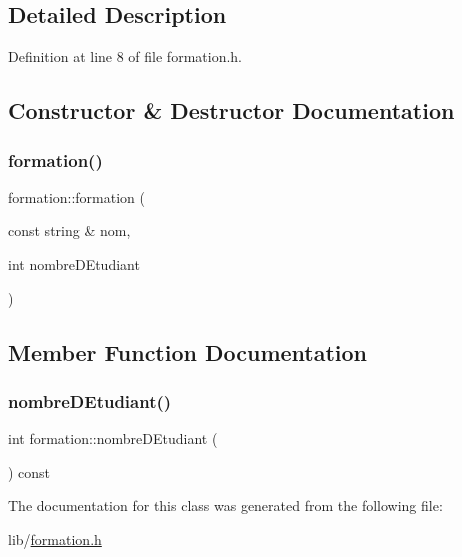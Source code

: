 \subsection{Detailed Description}


Definition at line 8 of file formation.\+h.



\subsection{Constructor \& Destructor Documentation}
\hypertarget{classformation_af34ced9e0539ebc32d9f87a79e3b383a}{}\label{classformation_af34ced9e0539ebc32d9f87a79e3b383a} 
\subsubsection{\texorpdfstring{formation()}{formation()}}
{\footnotesize\ttfamily formation\+::formation (\begin{DoxyParamCaption}\item[{const string \&}]{nom,  }\item[{int}]{nombre\+D\+Etudiant }\end{DoxyParamCaption})}



\subsection{Member Function Documentation}
\hypertarget{classformation_ad2cf7556c2c72212e1305a287ce25580}{}\label{classformation_ad2cf7556c2c72212e1305a287ce25580} 
\subsubsection{\texorpdfstring{nombre\+D\+Etudiant()}{nombreDEtudiant()}}
{\footnotesize\ttfamily int formation\+::nombre\+D\+Etudiant (\begin{DoxyParamCaption}{ }\end{DoxyParamCaption}) const}



The documentation for this class was generated from the following file\+:\begin{DoxyCompactItemize}
\item 
lib/\hyperlink{formation_8h}{formation.\+h}\end{DoxyCompactItemize}
